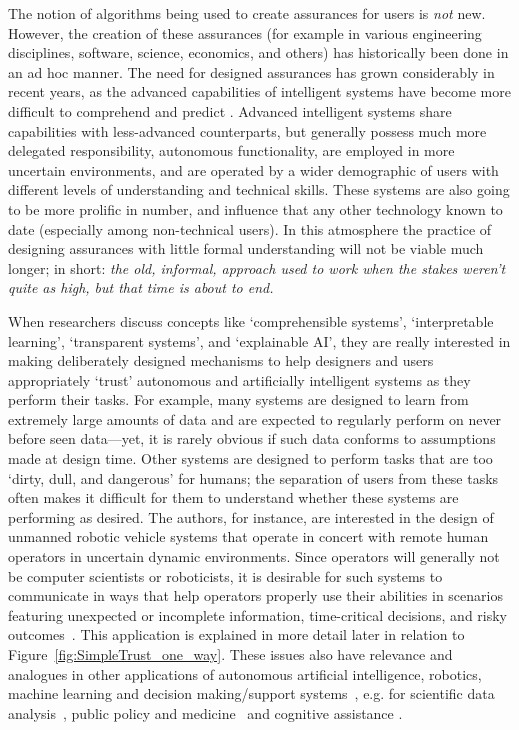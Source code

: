 The notion of algorithms being used to create assurances for users is \emph{not} new. However, the creation of these assurances (for example in various engineering disciplines, software, science, economics, and others) has historically been done in an ad hoc manner. The need for designed assurances has grown considerably in recent years, as the advanced capabilities of intelligent systems have become more difficult to comprehend and predict \cite{Doshi-Velez2017-xy, Weller2017-zx, Lipton2016-ug, Gunning2017-ih}. Advanced intelligent systems share capabilities with less-advanced counterparts, but generally possess much more delegated responsibility, autonomous functionality, are employed in more uncertain environments, and are operated by a wider demographic of users with different levels of understanding and technical skills. These systems are also going to be more prolific in number, and influence that any other technology known to date (especially among non-technical users). In this atmosphere the practice of designing assurances with little formal understanding will not be viable much longer; in short: \emph{the old, informal, approach used to work when the stakes weren't quite as high, but that time is about to end.}

When researchers discuss concepts like `comprehensible systems', `interpretable learning', `transparent systems', and `explainable AI', they are really interested in making deliberately designed mechanisms to help designers and users appropriately `trust' autonomous and artificially intelligent systems as they perform their tasks. 
For example, many systems are designed to learn from extremely large amounts of data and are expected to regularly perform on never before seen data---yet, it is rarely obvious if such data conforms to assumptions made at design time. 
Other systems are designed to perform tasks that are too `dirty, dull, and dangerous' for humans; the separation of users from these tasks often makes it difficult for them to understand whether these systems are performing as desired. 
The authors, for instance, are interested in the design of unmanned robotic vehicle systems that operate in concert with remote human operators in uncertain dynamic environments. 
Since operators will generally not be computer scientists or roboticists, it is desirable for such systems to communicate in ways that help operators properly use their abilities in scenarios featuring unexpected or incomplete information, time-critical decisions, and risky outcomes~\cite{Hutchins2015-if, Sweet2016-tz}. 
This application is explained in more detail later in relation to Figure~\ref{fig:SimpleTrust_one_way}. 
These issues also have relevance and analogues in other applications of autonomous artificial intelligence, robotics, machine learning and decision making/support systems~\cite{Garcia2015-rs,Otte2013-oo,Sugiyama2013-ci,Amodei2016-xi}, e.g. for scientific data analysis~\cite{Faghmous2014-og}, public policy and medicine~\cite{Wagner2016-ck,Jovanovic2016-gw} and cognitive assistance \cite{Gutfreund2016-xe}.

